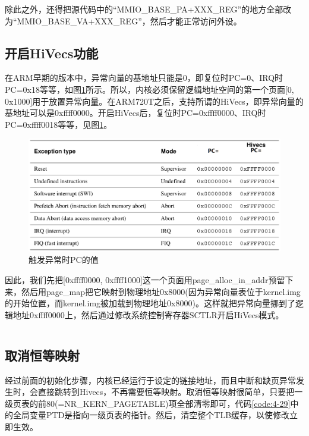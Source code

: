 \documentclass[main.tex]{subfiles}
\begin{document}
\begin{CJK*}{UTF8}{song}
\begin{code}
\label{code:4-27}
\inputminted[firstline=379,lastline=384,linenos,numbersep=5pt,frame=lines,framesep=2mm]{c}{src/chapter04/kernel/machdep.c}
\end{code}

除此之外，还得把源代码中的“MMIO\_BASE\_PA+XXX\_REG”的地方全部改为“MMIO\_BASE\_VA+XXX\_REG”，然后才能正常访问外设。

\subsection{开启HiVecs功能}
在ARM早期的版本中，异常向量的基地址只能是0，即复位时PC=0、IRQ时PC=0x18等等，如图\ref{figure:4-8}所示。所以，内核必须保留逻辑地址空间的第一个页面[0, 0x1000]用于放置异常向量。在ARM720T之后，支持所谓的HiVecs，即异常向量的基地址可以是0xffff0000。开启HiVecs后，复位时PC=0xffff0000、IRQ时PC=0xffff0018等等，见图\ref{figure:4-8}。

\begin{figure}[htp]
\centering
\includegraphics[scale=0.3]{figures/4-8}
\caption{触发异常时PC的值}
\label{figure:4-8}
\end{figure}

因此，我们先把[0xffff0000, 0xffff1000]这一个页面用page\_alloc\_in\_addr预留下来，然后用page\_map把它映射到物理地址0x8000(因为异常向量表位于kernel.img的开始位置，而kernel.img被加载到物理地址0x8000)。这样就把异常向量挪到了逻辑地址0xffff0000上，然后通过修改系统控制寄存器SCTLR开启HiVecs模式。

\begin{code}
\label{code:4-28}
\inputminted[firstline=386,lastline=404,linenos,numbersep=5pt,frame=lines,framesep=2mm]{c}{src/chapter04/kernel/machdep.c}
\end{code}

\subsection{取消恒等映射}
经过前面的初始化步骤，内核已经运行于设定的链接地址，而且中断和缺页异常发生时，会直接跳转到Hivecs，不再需要恒等映射。取消恒等映射很简单，只要把一级页表的前80(=NR\_KERN\_PAGETABLE)项全部清零即可，代码\ref{code:4-29}中的全局变量PTD是指向一级页表的指针。然后，清空整个TLB缓存，以使修改立即生效。


\end{CJK*}
\end{document}

